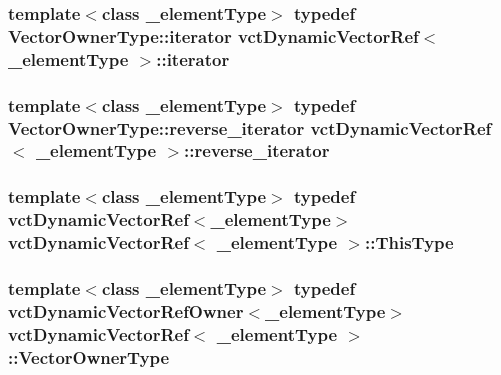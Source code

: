 \subsubsection[{iterator}]{\setlength{\rightskip}{0pt plus 5cm}template$<$class \+\_\+element\+Type$>$ typedef {\bf Vector\+Owner\+Type\+::iterator} {\bf vct\+Dynamic\+Vector\+Ref}$<$ \+\_\+element\+Type $>$\+::{\bf iterator}}\label{classvct_dynamic_vector_ref_a60db16bd51d6129d93e63c1df05c544e}
\hypertarget{classvct_dynamic_vector_ref_a4fe85ab37aaaa4b4bd16d4258e91d8b8}{}
\subsubsection[{reverse\+\_\+iterator}]{\setlength{\rightskip}{0pt plus 5cm}template$<$class \+\_\+element\+Type$>$ typedef {\bf Vector\+Owner\+Type\+::reverse\+\_\+iterator} {\bf vct\+Dynamic\+Vector\+Ref}$<$ \+\_\+element\+Type $>$\+::{\bf reverse\+\_\+iterator}}\label{classvct_dynamic_vector_ref_a4fe85ab37aaaa4b4bd16d4258e91d8b8}
\hypertarget{classvct_dynamic_vector_ref_adde8a247e72c476120c26cfa15a37c6d}{}
\subsubsection[{This\+Type}]{\setlength{\rightskip}{0pt plus 5cm}template$<$class \+\_\+element\+Type$>$ typedef {\bf vct\+Dynamic\+Vector\+Ref}$<$\+\_\+element\+Type$>$ {\bf vct\+Dynamic\+Vector\+Ref}$<$ \+\_\+element\+Type $>$\+::{\bf This\+Type}}\label{classvct_dynamic_vector_ref_adde8a247e72c476120c26cfa15a37c6d}
\hypertarget{classvct_dynamic_vector_ref_a36c9bed92a3ffb5d3adc86deabbb671e}{}
\subsubsection[{Vector\+Owner\+Type}]{\setlength{\rightskip}{0pt plus 5cm}template$<$class \+\_\+element\+Type$>$ typedef {\bf vct\+Dynamic\+Vector\+Ref\+Owner}$<$\+\_\+element\+Type$>$ {\bf vct\+Dynamic\+Vector\+Ref}$<$ \+\_\+element\+Type $>$\+::{\bf Vector\+Owner\+Type}}\label{classvct_dynamic_vector_ref_a36c9bed92a3ffb5d3adc86deabbb671e}


